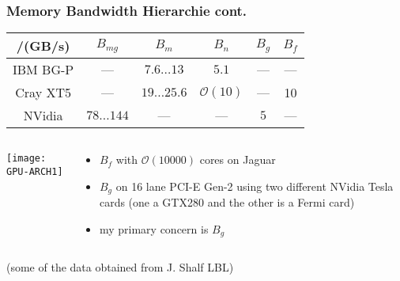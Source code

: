 \documentclass[xcolor=pdftex,table,10pt,yellow,mathserif]{beamer}
\begin{document}
	\begin{frame}
	\frametitle{Memory Bandwidth Hierarchie cont. } 
	
  \begin{center}
          \begin{tabular}{cccccc}
            \hline
             {\tiny /(GB/s)}& $B_{mg}$ & $B_m$ & $B_n$ & $B_g$ & $B_f$ \\
            \hline
            IBM BG-P & --- & $7.6 \dots 13$ &$5.1$& --- & --- \\
            \hline
            Cray XT5 & --- & $19 \dots 25.6$ & $ \mathcal{O}(10)$ & --- & 10 \\
            \hline
            NVidia & $78 \dots 144$  & --- & --- & $5$ & --- \\
            \hline
          \end{tabular}
        \end{center}

	\begin{columns}
		\begin{column}{5.5cm}
		\begin{center}
\texttt{[image: GPU-ARCH1]}
\end{center}	
		\end{column}
		\begin{column}{5.5cm}
\begin{itemize}
\item $B_f$ with $\mathcal{O}(10000)$ cores on Jaguar
\item $B_g$ on 16 lane PCI-E Gen-2 using two different NVidia Tesla cards (one a GTX280 and the other is a Fermi card)
\item \alert{my primary concern is $B_g$}
\end{itemize}		
		\end{column}
	\end{columns}

(some of the data obtained from J. Shalf LBL)
		
	\end{frame}
\end{document}
